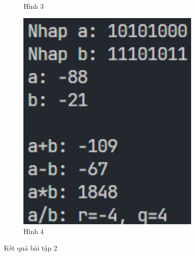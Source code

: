 \documentclass[a4paper,12pt]{report}
\begin{document}
\begin{figure}[!ht]
\begin{subfigure}{0.36\textwidth}
		\caption{Hình 3}
	\end{subfigure}
	\hfill
	\begin{subfigure}{0.36\textwidth}
		\centering
		\includegraphics[width=1\textwidth]{imgs/2-4.png}
		\caption{Hình 4}
	\end{subfigure}

	\caption{Kết quả bài tập 2}
\end{figure}
\end{document}
